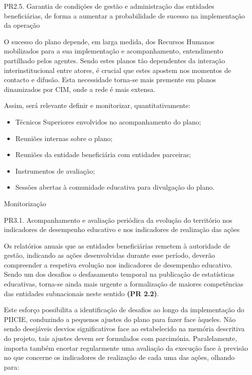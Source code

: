 \documentclass[
]{book}
\providecommand{\tightlist}{%
  \setlength{\itemsep}{0pt}\setlength{\parskip}{0pt}}
\begin{document}
\leavevmode{}%
PR2.5. Garantia de condições de gestão e administração das entidades beneficiárias, de forma a aumentar a probabilidade de sucesso na implementação da operação

O sucesso do plano depende, em larga medida, dos Recursos Humanos mobilizados para a sua implementação e acompanhamento, entendimento partilhado pelos agentes. Sendo estes planos tão dependentes da interação interinstitucional entre atores, é crucial que estes apostem nos momentos de contacto e difusão. Esta necessidade torna-se mais premente em planos dinamizados por CIM, onde a rede é mais extensa.

Assim, será relevante definir e monitorizar, quantitativamente:

\begin{itemize}
\tightlist
\item
  Técnicos Superiores envolvidos no acompanhamento do plano;\\
\item
  Reuniões internas sobre o plano;\\
\item
  Reuniões da entidade beneficiária com entidades parceiras;\\
\item
  Instrumentos de avaliação;\\
\item
  Sessões abertas à comunidade educativa para divulgação do plano.
\end{itemize}

\leavevmode{}%
Monitorização

\leavevmode{}%
PR3.1. Acompanhamento e avaliação periódica da evolução do território nos indicadores de desempenho educativo e nos indicadores de realização das ações

Os relatórios anuais que as entidades beneficiárias remetem à autoridade de gestão, indicando as ações desenvolvidas durante esse período, deverão compreender a respetiva evolução nos indicadores de desempenho educativo. Sendo um dos desafios o desfasamento temporal na publicação de estatísticas educativas, torna-se ainda mais urgente a formalização de maiores competências das entidades subnacionais neste sentido \textbf{(PR 2.2)}.

Este esforço possibilita a identificação de desafios ao longo da implementação do PIICIE, conduzindo a pequenos ajustes do plano para fazer face àqueles. Não sendo desejáveis desvios significativos face ao estabelecido na memória descritiva do projeto, tais ajustes devem ser formulados com parcimónia.
Paralelamente, importa também encetar regularmente uma avaliação da execução face à previsão no que concerne os indicadores de realização de cada uma das ações, olhando para:
\end{document}
